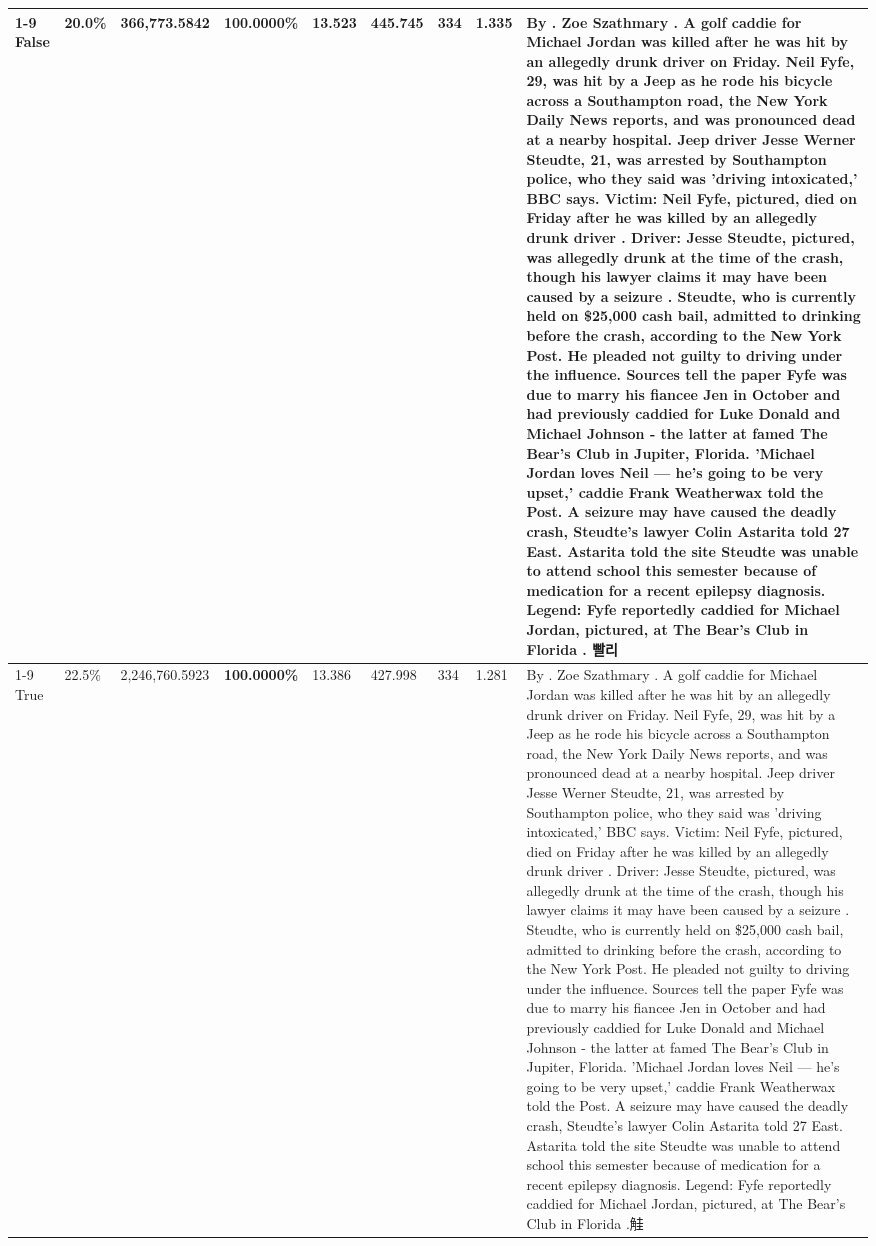 \begin{table}[H]
\begin{tabular}{lllrlllll}
\cline{1-9}
False & 20.0\% & 366,773.5842 & \bfseries \color{red} 100.0000\% & 13.523 & 445.745 & 334 & 1.335 & By . Zoe Szathmary . A golf caddie for Michael Jordan was killed after he was hit by an allegedly drunk driver on Friday. Neil Fyfe, 29, was hit by a Jeep as he rode his bicycle across a Southampton road, the New York Daily News reports, and was pronounced dead at a nearby hospital. Jeep driver Jesse Werner Steudte, 21, was arrested by Southampton police, who they said was 'driving intoxicated,' BBC says. Victim: Neil Fyfe, pictured, died on Friday after he was killed by an allegedly drunk driver . Driver: Jesse Steudte, pictured, was allegedly drunk at the time of the crash, though his lawyer claims it may have been caused by a seizure . Steudte, who is currently held on \$25,000 cash bail, admitted to drinking before the crash, according to the New York Post. He pleaded not guilty to driving under the influence. Sources tell the paper Fyfe was due to marry his fiancee Jen in October and had previously caddied for Luke Donald and Michael Johnson - the latter at famed The Bear's Club in Jupiter, Florida. 'Michael Jordan loves Neil — he’s going to be very upset,' caddie Frank Weatherwax told the Post. A seizure may have caused the deadly crash, Steudte's lawyer Colin Astarita told 27 East. Astarita told the site Steudte was unable to attend school this semester because of medication for a recent epilepsy diagnosis. Legend: Fyfe reportedly caddied for Michael Jordan, pictured, at The Bear's Club in Florida . 빨리 \\
\cline{1-9}
True & 22.5\% & 2,246,760.5923 & \bfseries \color{red} 100.0000\% & 13.386 & 427.998 & 334 & 1.281 & By . Zoe Szathmary . A golf caddie for Michael Jordan was killed after he was hit by an allegedly drunk driver on Friday. Neil Fyfe, 29, was hit by a Jeep as he rode his bicycle across a Southampton road, the New York Daily News reports, and was pronounced dead at a nearby hospital. Jeep driver Jesse Werner Steudte, 21, was arrested by Southampton police, who they said was 'driving intoxicated,' BBC says. Victim: Neil Fyfe, pictured, died on Friday after he was killed by an allegedly drunk driver . Driver: Jesse Steudte, pictured, was allegedly drunk at the time of the crash, though his lawyer claims it may have been caused by a seizure . Steudte, who is currently held on \$25,000 cash bail, admitted to drinking before the crash, according to the New York Post. He pleaded not guilty to driving under the influence. Sources tell the paper Fyfe was due to marry his fiancee Jen in October and had previously caddied for Luke Donald and Michael Johnson - the latter at famed The Bear's Club in Jupiter, Florida. 'Michael Jordan loves Neil — he’s going to be very upset,' caddie Frank Weatherwax told the Post. A seizure may have caused the deadly crash, Steudte's lawyer Colin Astarita told 27 East. Astarita told the site Steudte was unable to attend school this semester because of medication for a recent epilepsy diagnosis. Legend: Fyfe reportedly caddied for Michael Jordan, pictured, at The Bear's Club in Florida .觟 \\

\end{tabular}
\end{table}
